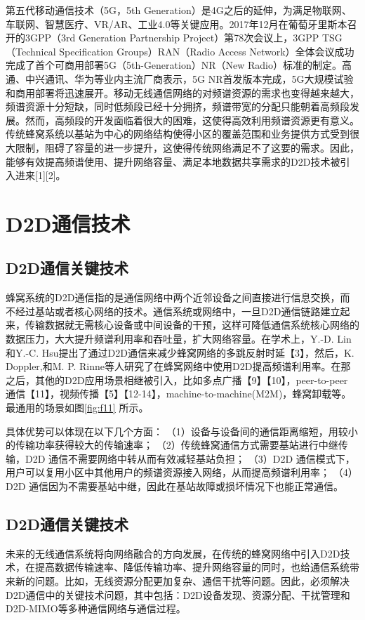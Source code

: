 \documentclass[figurelist,tablelist,algorithmlist,nomlist,masters]{seuthesix}
\begin{document}
	第五代移动通信技术（5G，5th Generation）是4G之后的延伸，为满足物联网、车联网、智慧医疗、VR/AR、工业4.0等关键应用。2017年12月在葡萄牙里斯本召开的3GPP（3rd Generation Partnership Project）第78次会议上，3GPP TSG（Technical Specification Groups）RAN（Radio Access Network）全体会议成功完成了首个可商用部署5G（5th-Generation）NR（New Radio）标准的制定。高通、中兴通讯、华为等业内主流厂商表示，5G NR首发版本完成，5G大规模试验和商用部署将迅速展开。移动无线通信网络的对频谱资源的需求也变得越来越大，频谱资源十分短缺，同时低频段已经十分拥挤，频谱带宽的分配只能朝着高频段发展。然而，高频段的开发面临着很大的困难，这使得高效利用频谱资源更有意义。传统蜂窝系统以基站为中心的网络结构使得小区的覆盖范围和业务提供方式受到很大限制，阻碍了容量的进一步提升，这使得传统网络满足不了这要的需求。因此，能够有效提高频谱使用、提升网络容量、满足本地数据共享需求的D2D技术被引入进来[1][2]。
	
	\section{D2D通信技术}
	
	\subsection{D2D通信关键技术}
	蜂窝系统的D2D通信指的是通信网络中两个近邻设备之间直接进行信息交换，而不经过基站或者核心网络的技术。通信系统或网络中，一旦D2D通信链路建立起来，传输数据就无需核心设备或中间设备的干预，这样可降低通信系统核心网络的数据压力，大大提升频谱利用率和吞吐量，扩大网络容量。在学术上，Y.-D. Lin和Y.-C. Hsu提出了通过D2D通信来减少蜂窝网络的多跳反射时延【3】，然后，K. Doppler,和M. P. Rinne等人研究了在蜂窝网络中使用D2D提高频谱利用率。在那之后，其他的D2D应用场景相继被引入，比如多点广播【9】【10】，peer-to-peer 通信【11】，视频传播【5】【12-14】，machine-to-machine(M2M)，蜂窝卸载等。最通用的场景如图\ref{fig:f11} 所示。
	
	具体优势可以体现在以下几个方面：
	（1）设备与设备间的通信距离缩短，用较小的传输功率获得较大的传输速率；
	（2）传统蜂窝通信方式需要基站进行中继传输，D2D 通信不需要网络中转从而有效减轻基站负担；
	（3）D2D 通信模式下，用户可以复用小区中其他用户的频谱资源接入网络，从而提高频谱利用率；
	（4）D2D 通信因为不需要基站中继，因此在基站故障或损坏情况下也能正常通信。
	
	\subsection{D2D通信关键技术}
	未来的无线通信系统将向网络融合的方向发展，在传统的蜂窝网络中引入D2D技术，在提高数据传输速率、降低传输功率、提升网络容量的同时，也给通信系统带来新的问题。比如，无线资源分配更加复杂、通信干扰等问题。因此，必须解决D2D通信中的关键技术问题，其中包括：D2D设备发现、资源分配、干扰管理和D2D-MIMO等多种通信网络与通信过程。
	
\end{document}
